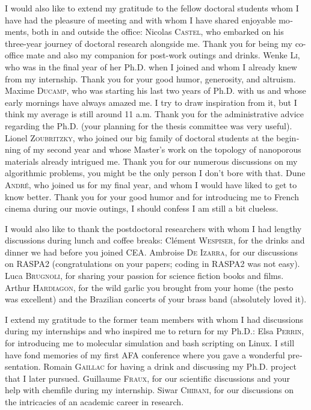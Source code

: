 \begin{otherlanguage}{english}
I would also like to extend my gratitude to the fellow doctoral students whom I have had the pleasure of meeting and with whom I have shared enjoyable moments, both in and outside the office: 
Nicolas \textsc{Castel}, who embarked on his three-year journey of doctoral research alongside me. Thank you for being my co-office mate and also my companion for post-work outings and drinks.
Wenke \textsc{Li}, who was in the final year of her Ph.D. when I joined and whom I already knew from my internship. Thank you for your good humor, generosity, and altruism.
Maxime \textsc{Ducamp}, who was starting his last two years of Ph.D. with us and whose early mornings have always amazed me. I try to draw inspiration from it, but I think my average is still around 11 a.m. Thank you for the administrative advice regarding the Ph.D. (your planning for the thesis committee was very useful).
Lionel \textsc{Zoubritzky}, who joined our big family of doctoral students at the beginning of my second year and whose Master's work on the topology of nanoporous materials already intrigued me. Thank you for our numerous discussions on my algorithmic problems, you might be the only person I don't bore with that.
Dune \textsc{André}, who joined us for my final year, and whom I would have liked to get to know better. Thank you for your good humor and for introducing me to French cinema during our movie outings, I should confess I am still a bit clueless.

I would also like to thank the postdoctoral researchers with whom I had lengthy discussions during lunch and coffee breaks:
Clément \textsc{Wespiser}, for the drinks and dinner we had before you joined CEA.
Ambroise \textsc{De Izarra}, for our discussions on RASPA2 (congratulations on your papers; coding in RASPA2 was not easy).
Luca \textsc{Brugnoli}, for sharing your passion for science fiction books and films.
Arthur \textsc{Hardiagon}, for the wild garlic you brought from your home (the pesto was excellent) and the Brazilian concerts of your brass band (absolutely loved it). 

I extend my gratitude to the former team members with whom I had discussions during my internships and who inspired me to return for my Ph.D.:
Elsa \textsc{Perrin}, for introducing me to molecular simulation and {\normalfont bash} scripting on {\normalfont Linux}. I still have fond memories of my first {\normalfont AFA} conference where you gave a wonderful presentation. 
Romain \textsc{Gaillac} for having a drink and discussing my Ph.D. project that I later pursued.
Guillaume \textsc{Fraux}, for our scientific discussions and your help with {\normalfont chemfile} during my internship.
Siwar \textsc{Chibani}, for our discussions on the intricacies of an academic career in research.


\end{otherlanguage}
